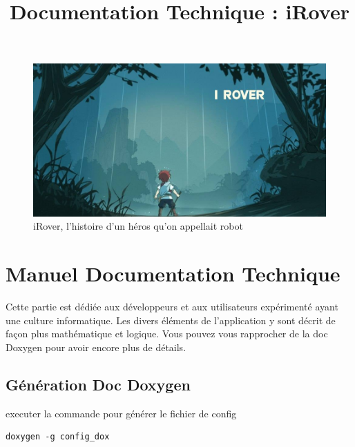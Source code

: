 \documentclass[a4paper 12pts]{article}
\title{Documentation Technique : iRover}
\author{}
\newenvironment{DDbox}[1]{
\begin{lrbox}{\BBbox}\begin{minipage}{\linewidth}}
{\end{minipage}\end{lrbox}\noindent\colorbox{Zgris}{\usebox{\BBbox}} \\
[.5cm]}
\begin{document}
\maketitle


\begin{figure}[h]
   \includegraphics[width=350pt]{Illustration/proj_irover.jpg}
	\caption{iRover, l'histoire d'un héros qu'on appellait robot}
\end{figure}



\newpage


\renewcommand{\contentsname}{Sommaire} 
\tableofcontents

\newpage





\section{Manuel Documentation Technique}


\vspace{2cm}

Cette partie est dédiée aux développeurs et aux utilisateurs expérimenté ayant une culture informatique.
Les divers éléments de l'application y sont décrit de façon plus mathématique et logique.
Vous pouvez vous rapprocher de la doc Doxygen pour avoir encore plus de détails.

\subsection{Génération Doc Doxygen}

executer la commande pour générer le fichier de config

\vspace{0.5 cm}
\begin{DDbox}{\linewidth}
\begin{verbatim}
doxygen -g config_dox
\end{verbatim}
\end{DDbox}
\end{document}

